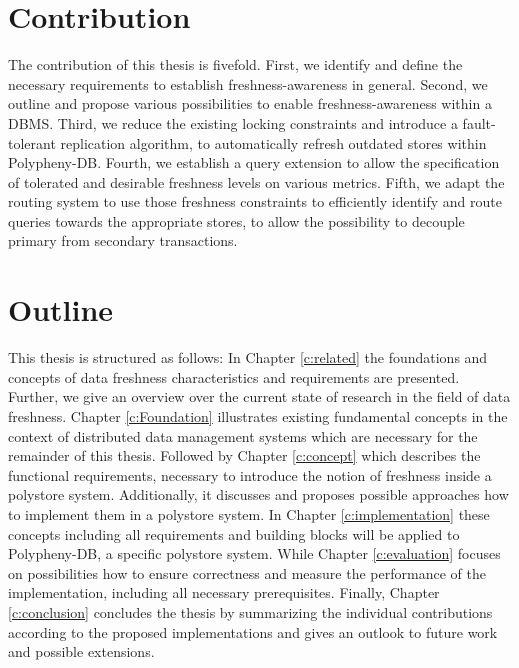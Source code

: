 
\section{Contribution}
The contribution of this thesis is fivefold. First, we identify and define the necessary requirements to establish freshness-awareness in general.
Second, we outline and propose various possibilities to enable freshness-awareness within a DBMS. Third, we reduce the existing locking constraints and 
introduce a fault-tolerant replication algorithm, to automatically refresh outdated stores within Polypheny-DB. 
Fourth, we establish a query extension to allow the specification of tolerated and desirable freshness levels 
on various metrics. Fifth, we adapt the routing system to use those freshness constraints to efficiently identify and route queries towards the appropriate stores, 
to allow the possibility to decouple primary from secondary transactions.




\section{Outline}
This thesis is structured as follows:
In Chapter \ref{c:related} the foundations and concepts of data freshness characteristics and requirements are presented.
Further, we give an overview over the current state of research in the field of data freshness. 
Chapter \ref{c:Foundation} illustrates existing fundamental concepts in the context of distributed data management systems 
which are necessary for the remainder of this thesis. 
Followed by Chapter \ref{c:concept} which describes the functional requirements, necessary to introduce the notion of freshness inside a polystore system. 
Additionally, it discusses and proposes possible approaches how to implement them in a polystore system. 
In Chapter \ref{c:implementation} these concepts including all requirements and building blocks will be applied to Polypheny-DB, a specific polystore system.
While Chapter \ref{c:evaluation} focuses on possibilities how to ensure correctness and measure the performance of the implementation, including all necessary prerequisites.
Finally, Chapter \ref{c:conclusion} concludes the thesis by summarizing the individual contributions according to the proposed
implementations and gives an outlook to future work and possible extensions.


